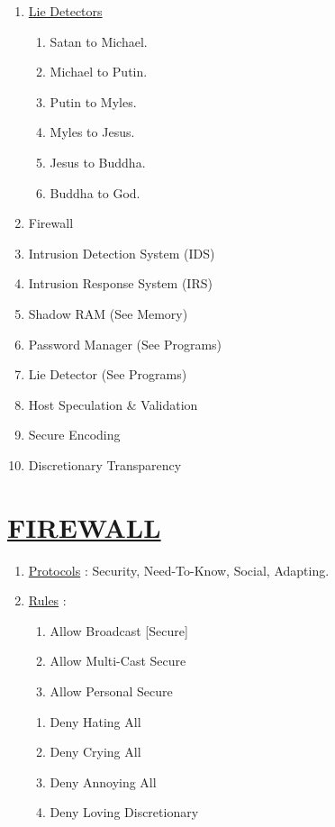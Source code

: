 \documentclass[11pt]{article}
\begin{document}
\begin{enumerate}
	\item[] \ul{Lie Detectors}
	\begin{enumerate}
		\item[] Satan to Michael.
		\item[] Michael to Putin.
		\item[] Putin to Myles.
		\item[] Myles to Jesus.
		\item[] Jesus to Buddha.
		\item[] Buddha to God.
	\end{enumerate}

	\item[] Firewall
	\item[] Intrusion Detection System (IDS)
	\item[] Intrusion Response System (IRS)
	\item[] Shadow RAM (See Memory)
	\item[] Password Manager (See Programs)
	\item[] Lie Detector (See Programs)
	\item[] Host Speculation \& Validation
	\item[] Secure Encoding
	\item[] Discretionary Transparency
	
\end{enumerate}


\section*{\ul{FIREWALL}}
\begin{enumerate}
	\item[] \ul{Protocols} : Security, Need-To-Know, Social, Adapting.

	\item[] \ul{Rules} :
	\begin{enumerate}
		\item[] Allow Broadcast [Secure]
		\item[] Allow Multi-Cast Secure
		\item[] Allow Personal Secure
	\end{enumerate}

	\begin{enumerate}
		\item[] Deny Hating All
		\item[] Deny Crying All
		\item[] Deny Annoying All
		\item[] Deny Loving Discretionary
	\end{enumerate}

\end{enumerate}
\end{document}
